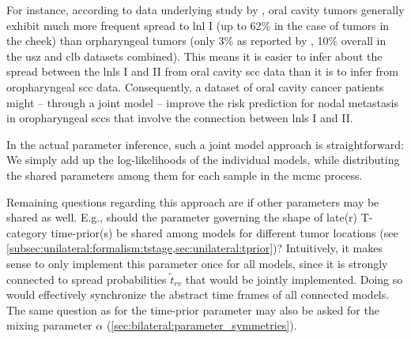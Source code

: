 \documentclass[\relativeRoot/main.tex]{subfiles}
\begin{document}
For instance, according to data underlying study by , oral cavity tumors generally exhibit much more frequent spread to \gls{lnl} I (up to 62\% in the case of tumors in the cheek) than orpharyngeal tumors (only 3\% as reported by , 10\% overall in the \gls{usz} and \gls{clb} datasets combined). This means it is easier to infer about the spread between the \glspl{lnl} I and II from oral cavity \gls{scc} data than it is to infer from oropharyngeal \gls{scc} data. Consequently, a dataset of oral cavity cancer patients might -- through a joint model -- improve the risk prediction for nodal metastasis in oropharyngeal \glspl{scc} that involve the connection between \glspl{lnl} I and II.

In the actual parameter inference, such a joint model approach is straightforward: We simply add up the log-likelihoods of the individual models, while distributing the shared parameters among them for each sample in the \gls{mcmc} process.

Remaining questions regarding this approach are if other parameters may be shared as well. E.g., should the parameter governing the shape of late(r) T-category time-prior(s) be shared among models for different tumor locations (see \cref{subsec:unilateral:formalism:tstage,sec:unilateral:tprior})? Intuitively, it makes sense to only implement this parameter once for all models, since it is strongly connected to spread probabilities $\tilde{t}_{rv}$ that would be jointly implemented. Doing so would effectively synchronize the abstract time frames of all connected models. The same question as for the time-prior parameter may also be asked for the mixing parameter $\alpha$ (\cref{sec:bilateral:parameter_symmetries}).
\end{document}
